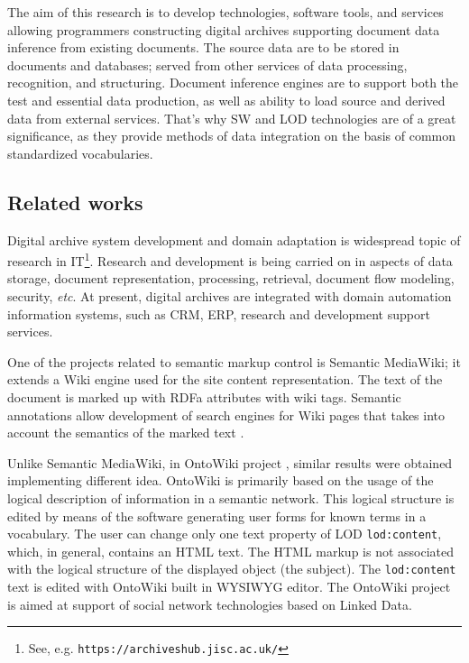 \documentclass[conference,a4paper]{IEEEtran}
\providecommand\url[1]{\texttt{#1}}
\begin{document}
The aim of this research is to develop technologies, software tools, and services allowing programmers constructing digital archives supporting document data inference from existing documents.  The source data are to be stored in documents and databases; served from other services of data processing, recognition, and structuring.  Document inference engines are to support both the test and essential data production, as well as ability to load source and derived data from external services.  That's why SW and LOD technologies are of a great significance, as they provide methods of data integration on the basis of common standardized vocabularies.

\subsection{Related works}
\label{sec:relwks}

Digital archive system development and domain adaptation is wide\-spre\-ad topic of research in IT\footnote{See, e.g. \url{https://archiveshub.jisc.ac.uk/}}.  Research and development is being carried on in aspects of data storage, document representation, processing, retrieval, document flow modeling, security, \textit{etc}.  At present, digital archives are integrated with domain automation information systems, such as CRM, ERP, research and development support services.

One of the projects related to semantic markup control is Semantic MediaWiki; it extends a Wiki engine used for the site content representation.  The text of the document is marked up with RDFa attributes with wiki tags.  Semantic annotations allow development of search engines for Wiki pages that takes into account the semantics of the marked text \cite{c6}.

Unlike Semantic MediaWiki, in OntoWiki project \cite{ontowiki}, similar results were obtained implementing different idea.  OntoWiki is primarily based on the usage of the logical description of information in a semantic network.  This logical structure is edited by means of the software generating user forms for known terms in a vocabulary.  The user can change only one text property of LOD \texttt{lod:content}, which, in general, contains an HTML text.  The HTML markup is not associated with the logical structure of the displayed object (the subject).  The \texttt{lod:content} text is edited with OntoWiki built in WYSIWYG editor.  The OntoWiki project is aimed at support of social network technologies based on Linked Data.
\end{document}
